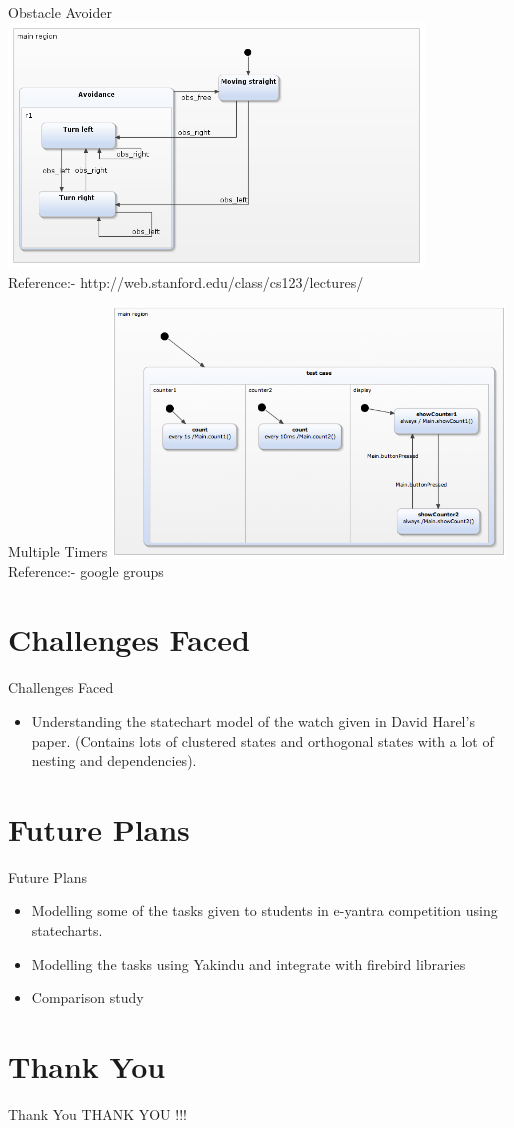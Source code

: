\documentclass[10pt, a4paper]{beamer}
\begin{document}
\begin{frame}{Obstacle Avoider}
\includegraphics[width=11.04cm, height=6.5cm]{obstacle_avoider.png}
\\
Reference:- http://web.stanford.edu/class/cs123/lectures/
\end{frame}

\begin{frame}{Multiple Timers}
\includegraphics[width=10.43cm, height=6.63cm]{ortho.png}
\\
Reference:- google groups
\end{frame}

\section{Challenges Faced}
\begin{frame}{Challenges Faced}
	\begin{itemize}
		\item Understanding the statechart model of the watch given in David Harel's paper. (Contains lots of clustered states and orthogonal states with a lot of nesting and dependencies). 
	\end{itemize}
\end{frame}

\section{Future Plans}
\begin{frame}{Future Plans}
	\begin{itemize}
		\item Modelling some of the tasks given to students in e-yantra
		competition using statecharts.
		\item Modelling the tasks using Yakindu and integrate with
		firebird libraries
		\item Comparison study
	\end{itemize}
\end{frame}


\section{Thank You}
\begin{frame}{Thank You}
	\centering THANK YOU !!!
\end{frame}
\end{document}
